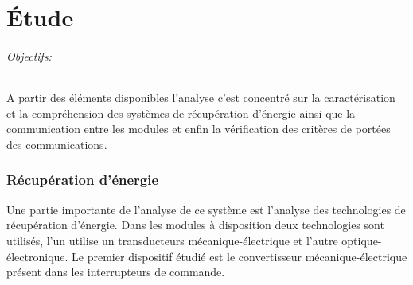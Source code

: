 \documentclass{rapportENS}
\begin{document}
 
 
 
 
 \part{Étude}
 \paragraph{Objectifs:}  A partir des éléments disponibles l'analyse c'est concentré sur la caractérisation et la compréhension des systèmes de récupération d'énergie ainsi que la communication entre les modules et enfin la vérification des critères de portées des communications.
 
 \section{Récupération d'énergie}
 Une partie importante de l'analyse de ce système est l'analyse des technologies de récupération d'énergie. Dans les modules à disposition deux technologies sont utilisés, l'un utilise un transducteurs mécanique-électrique et l'autre optique-électronique. Le premier dispositif étudié est le convertisseur mécanique-électrique présent dans les interrupteurs de commande.
\end{document}
